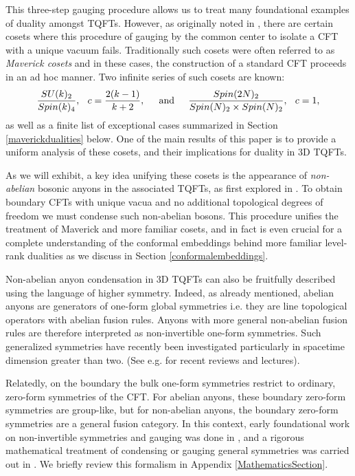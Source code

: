 \documentclass[11pt]{article}
\numberwithin{equation}{section}
\begin{document}
This three-step gauging procedure allows us to treat many foundational examples of duality amongst TQFTs.  However, as originally noted in \cite{Dunbar:1992gh,Dunbar:1993hr}, there are certain cosets where this procedure of gauging by the common center to isolate a CFT with a unique vacuum fails.  Traditionally such cosets were often referred to as \emph{Maverick cosets} and in these cases, the construction of a standard CFT proceeds in an ad hoc manner.  Two infinite series of such cosets are known:
\begin{equation}\label{maverickintro}
    \frac{SU(k)_{2}}{Spin(k)_{4}}, \hspace{.1in}c=\frac{2(k-1)}{k+2}, \hspace{.2in}\text{and}\hspace{.2in} \frac{Spin(2N)_{2}}{Spin(N)_{2}\times Spin(N)_{2}},\hspace{.1in}c=1,
\end{equation}
as well as a finite list of exceptional cases summarized in Section \ref{maverickdualities} below.  One of the main results of this paper is to provide a uniform analysis of these cosets, and their implications for duality in 3D TQFTs.  

As we will exhibit, a key idea unifying these cosets is the appearance of \emph{non-abelian} bosonic anyons in the associated TQFTs, as first explored in \cite{Frohlich:2003hm,Bais:2008ni}. To obtain boundary CFTs with unique vacua and no additional topological degrees of freedom we must condense such non-abelian bosons. This procedure unifies the treatment of Maverick and more familiar cosets, and in fact is even crucial for a complete understanding of the conformal embeddings behind more familiar level-rank dualities as we discuss in Section \ref{conformalembeddings}. 

Non-abelian anyon condensation in 3D TQFTs can also be fruitfully described using the language of higher symmetry. Indeed, as already mentioned, abelian anyons are generators of one-form global symmetries i.e. they are line topological operators with abelian fusion rules.  Anyons with more general non-abelian fusion rules are therefore interpreted as non-invertible one-form symmetries.  Such generalized symmetries have recently been investigated particularly in spacetime dimension greater than two.  (See e.g. \cite{Cordova:2022ruw, Schafer-Nameki:2023jdn, Shao:2023gho} for recent reviews and lectures).  

Relatedly, on the boundary the bulk one-form symmetries restrict to ordinary, zero-form symmetries of the CFT.  For abelian anyons, these boundary zero-form symmetries are group-like, but for non-abelian anyons, the boundary zero-form symmetries are a general fusion category. In this context, early foundational work on non-invertible symmetries and gauging was done in \cite{Fuchs:2002cm,Fuchs:2003id, Fuchs:2004dz,Fuchs:2004xi,Frohlich:2004ef,Frohlich:2006ch}, and a rigorous mathematical treatment of condensing or gauging general symmetries was carried out in \cite{muger2001subfactors, MUGER2000151, kirillov2002q, davydov2013witt, Hung:2015hfa, kong2014anyon}. We briefly review this formalism in Appendix \ref{MathematicsSection}.  
\end{document}

